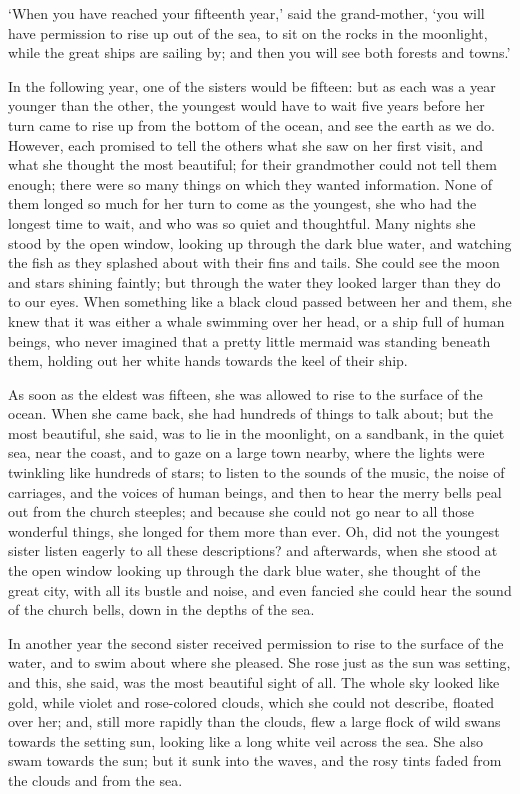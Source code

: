 `When you have reached your fifteenth year,' said the
grand-mother, `you will have permission to rise up out of the sea,
to sit on the rocks in the moonlight, while the great ships are
sailing by; and then you will see both forests and towns.'

In the following year, one of the sisters would be fifteen: but as
each was a year younger than the other, the youngest would have to
wait five years before her turn came to rise up from the bottom of the
ocean, and see the earth as we do. 
However, each promised to tell
the others what she saw on her first visit, and what she thought the
most beautiful; for their grandmother could not tell them enough;
there were so many things on which they wanted information. 
None of
them longed so much for her turn to come as the youngest, she who
had the longest time to wait, and who was so quiet and thoughtful.
Many nights she stood by the open window, looking up through the
dark blue water, and watching the fish as they splashed about with
their fins and tails. 
She could see the moon and stars shining
faintly; but through the water they looked larger than they do to
our eyes. 
When something like a black cloud passed between her and
them, she knew that it was either a whale swimming over her head, or a
ship full of human beings, who never imagined that a pretty little
mermaid was standing beneath them, holding out her white hands towards
the keel of their ship.

As soon as the eldest was fifteen, she was allowed to rise to
the surface of the ocean. 
When she came back, she had hundreds of
things to talk about; but the most beautiful, she said, was to lie
in the moonlight, on a sandbank, in the quiet sea, near the coast, and
to gaze on a large town nearby, where the lights were twinkling like
hundreds of stars; to listen to the sounds of the music, the noise
of carriages, and the voices of human beings, and then to hear the
merry bells peal out from the church steeples; and because she could
not go near to all those wonderful things, she longed for them more
than ever. 
Oh, did not the youngest sister listen eagerly to all these
descriptions? and afterwards, when she stood at the open window
looking up through the dark blue water, she thought of the great city,
with all its bustle and noise, and even fancied she could hear the
sound of the church bells, down in the depths of the sea.

In another year the second sister received permission to rise to
the surface of the water, and to swim about where she pleased. 
She
rose just as the sun was setting, and this, she said, was the most
beautiful sight of all. 
The whole sky looked like gold, while violet
and rose-colored clouds, which she could not describe, floated over
her; and, still more rapidly than the clouds, flew a large flock of
wild swans towards the setting sun, looking like a long white veil
across the sea. 
She also swam towards the sun; but it sunk into the
waves, and the rosy tints faded from the clouds and from the sea.

